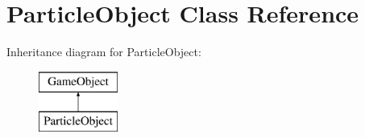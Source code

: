 \hypertarget{class_particle_object}{}\section{Particle\+Object Class Reference}
\label{class_particle_object}
Inheritance diagram for Particle\+Object\+:\begin{figure}[H]
\begin{center}
\leavevmode
\includegraphics[height=2.000000cm]{class_particle_object}
\end{center}
\end{figure}
